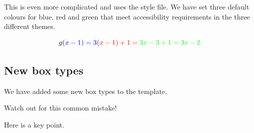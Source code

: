 \documentclass[
  letterpaper,
]{article}
\numberwithin{equation}{section}
\numberwithin{figure}{section}
\theoremstyle{break}
\begin{document}
This is even more complicated and uses the style file. We have set three
default colours for blue, red and green that meet accessibility
requirements in the three different themes.

\[
g(\color{blue}{x-1}) = 3(\color{red}{x-1}) + 1 = \color{green}{3x} - 3 + 1 = 3x-2.
\]

\subsection{New box types}\label{new-box-types}

We have added some new box types to the template.

Watch out for this common mistake!

Here is a key point.
\end{document}
